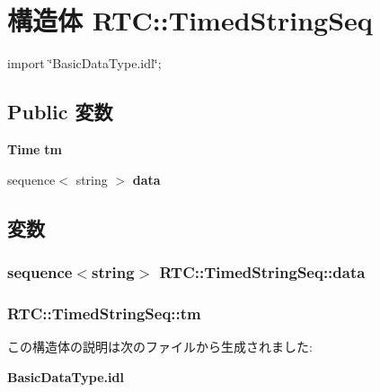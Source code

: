 \section{構造体 RTC::TimedStringSeq}
\label{structRTC_1_1TimedStringSeq}


{\ttfamily import \char`\"{}BasicDataType.idl\char`\"{};}

\subsection*{Public 変数}
\begin{DoxyCompactItemize}
\item 
{\bf Time} {\bf tm}
\item 
sequence$<$ string $>$ {\bf data}
\end{DoxyCompactItemize}


\subsection{変数}
\subsubsection[{data}]{\setlength{\rightskip}{0pt plus 5cm}sequence$<$string$>$ {\bf RTC::TimedStringSeq::data}}\label{structRTC_1_1TimedStringSeq_a92c9a5f303b7115189a2b89ab1ceb40e}
\subsubsection[{tm}]{ {\bf RTC::TimedStringSeq::tm}}\label{structRTC_1_1TimedStringSeq_a26233554a1a8cddc491eaedc7d9338f2}


この構造体の説明は次のファイルから生成されました:\begin{DoxyCompactItemize}
\item 
{\bf BasicDataType.idl}\end{DoxyCompactItemize}
